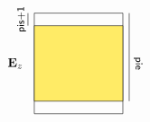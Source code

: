 \documentclass[10pt]{article}
\begin{document}
\[\begin{tikzpicture}
%
\node[draw=black,minimum width=7em,minimum height=8em,rectangle]  at (0,0) {};
\node[draw=black,fill=nyellow!60,minimum width=7em,minimum height=6em,rectangle]  at (0,0) {};
%
\node[]  at (-5em,0) {${\bf E}_z$};
%
\draw[] (-4em,4em) -- (-4em,3em);
\draw[] (4em,-3em) -- (4em,4em);
%
\node[rotate=-90]  at (4.7em,0) {\footnotesize{{\sf pie}}};
\node[rotate=90]  at (-4.5em,3.5em) {\footnotesize{{\sf pis+1}}};
\end{tikzpicture}
\]
\end{document}
